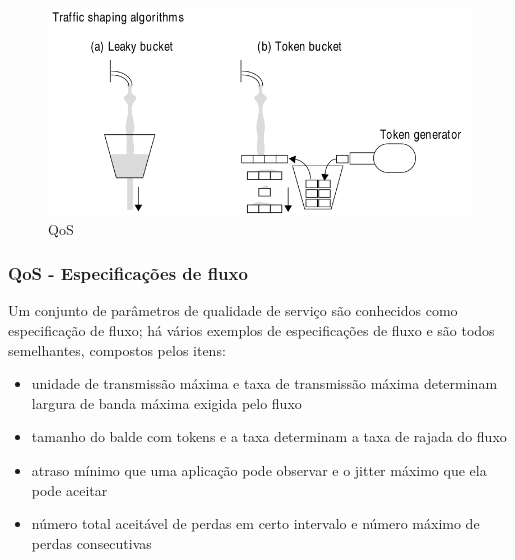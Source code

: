 \documentclass[]{beamer}
\begin{document}
\begin{frame}
  \begin{figure}[hbtp]
   \caption{QoS}
   \begin{center}
    \includegraphics[scale=0.33]{balde_furado.png}
   \end{center}
  \end{figure}
\end{frame}

\begin{frame}
  \frametitle{QoS - Especificações de fluxo}
 Um conjunto de parâmetros de qualidade de serviço são conhecidos 
como especificação de fluxo; há vários exemplos de especificações de fluxo
e são todos semelhantes, compostos pelos itens:
  \begin{itemize}
   \item unidade de transmissão máxima e taxa de transmissão máxima determinam largura de 
banda máxima exigida pelo fluxo
   \item tamanho do balde com tokens e a taxa determinam a taxa de rajada do fluxo
   \item atraso mínimo que uma aplicação pode observar e o jitter máximo que ela
pode aceitar
   \item número total aceitável de perdas em certo intervalo e número máximo de perdas
consecutivas
  \end{itemize}
\end{frame}
\end{document}
